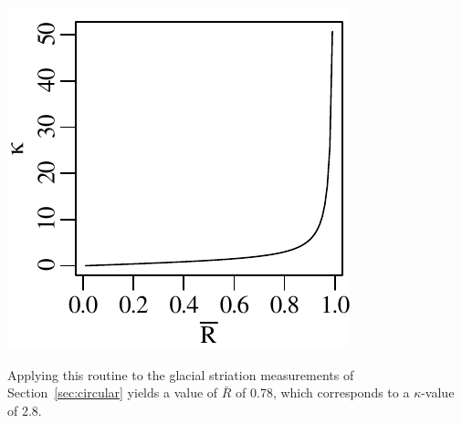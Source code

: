 \noindent\begin{minipage}[t][][b]{.3\textwidth}
\includegraphics[width=\textwidth]{../figures/R2K.pdf}\medskip
\end{minipage}
\begin{minipage}[t][][t]{.7\textwidth}
  \label{fig:R2K}
\end{minipage}

Applying this routine to the glacial striation measurements of
Section~\ref{sec:circular} yields a value of $\bar{R}$ of 0.78, which
corresponds to a $\kappa$-value of 2.8.


